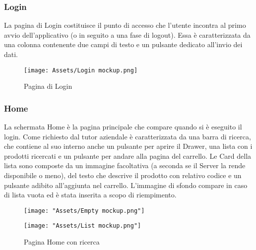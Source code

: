 \def\ImageSize{0.35}
 
\subsubsection{Login}
La pagina di Login costituisce il punto di accesso che l'utente incontra al primo avvio dell'applicativo (o in seguito a una fase di logout). Essa è caratterizzata da una colonna contenente due campi di testo e un pulsante dedicato all'invio dei dati.
\begin{figure}[H]
    \centering
    \texttt{[image: Assets/Login mockup.png]}
    \caption{Pagina di Login}
    \label{login_figma}
\end{figure}
\noindent

\newpage
\subsubsection{Home}
La schermata Home è la pagina principale che compare quando si è eseguito il login. Come richiesto dal tutor aziendale è caratterizzata da una barra di ricerca, che contiene al suo interno anche un pulsante per aprire il Drawer, una lista con i prodotti ricercati e un pulsante per andare alla pagina del carrello. Le Card \cite{card} della lista sono composte da un immagine facoltativa (a seconda se il Server la rende disponibile o meno), del testo che descrive il prodotto con relativo codice e un pulsante adibito all'aggiunta nel carrello. L'immagine di sfondo compare in caso di lista vuota ed è stata inserita a scopo di riempimento.
\begin{figure}[h]
\centering
	\begin{minipage}[t]{\ImageSize\linewidth}
		\texttt{[image: "Assets/Empty mockup.png"]}
		\caption{Pagina Home con ricerca}
		\label{fig:figma_home}
	\end{minipage}
	\hspace{1em}
	\begin{minipage}[t]{\ImageSize\linewidth}
		\texttt{[image: "Assets/List mockup.png"]}
	\end{minipage}

\end{figure}

\newpage
